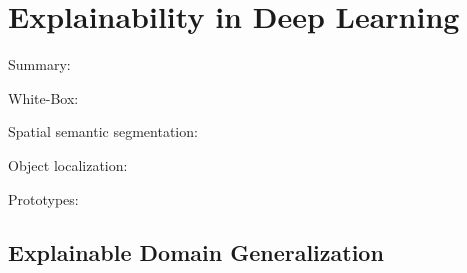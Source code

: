 \chapter{Explainability in Deep Learning} 
\label{Explainability} 

Summary: \citep{xie2020explainable}

White-Box: \citep{BargalZKZMS18} \citep{SelvarajuCDVPB20} \citep{SimonyanVZ13} \citep{SpringenbergDBR14} \citep{ZeilerF14} \citep{ZhangBLBSS18} \citep{ZhouKLOT16} \citep{ChenLTBRS19} 
\citep{CaoLYYWWHWHXRH15} \citep{SelvarajuLSJGHB19}

Spatial semantic segmentation: \citep{LiWPE018} \citep{ZhouZYQJ18} \citep{WeiFLCZY17}

Object localization: \citep{ZhangWF0H18}

 Prototypes: \citep{LiLCR18}




\section{Explainable Domain Generalization}

\citep{zunino2020explainable}